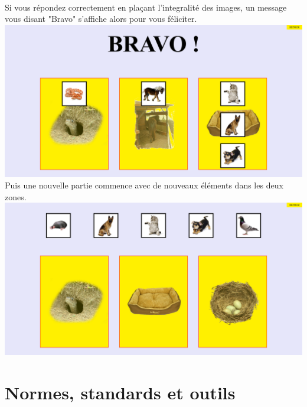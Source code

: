 \documentclass{article}
\begin{document}
\vspace{0.5cm}\\
Si vous r\'epondez correctement en pla\c{c}ant l'integralit\'e des images, un message vous disant "Bravo" s'affiche alors pour vous f\'eliciter.
\vspace{0.5cm}\\
\includegraphics[width=1.0\textwidth]{zone6}
\vspace{0.5cm}\\
Puis une nouvelle partie commence avec de nouveaux \'el\'ements dans les deux zones.
\vspace{0.5cm}\\
\includegraphics[width=1.0\textwidth]{zone7}
\vspace{0.5cm}\\


\section{Normes, standards et outils}
\end{document}
